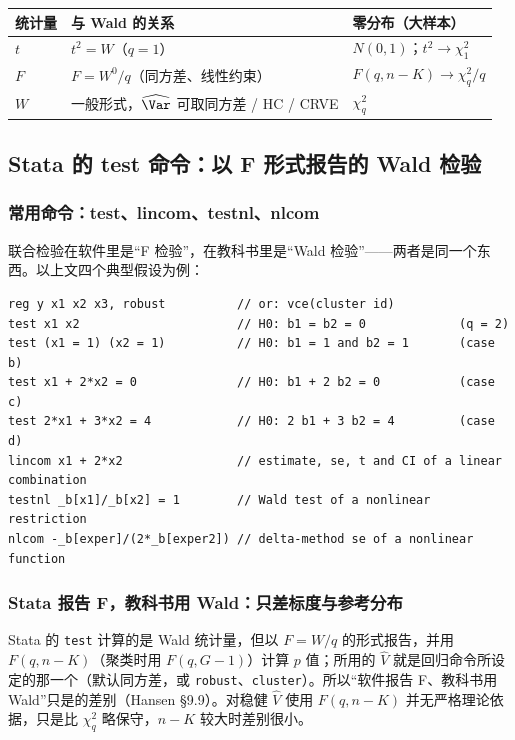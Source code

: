 \begin{center}
\small
\begin{tabularx}{\linewidth}{lLl}
\toprule
统计量 & 与 Wald 的关系 & 零分布（大样本）\\
\midrule
$t$ & $t^2=W$（$q=1$） & $N(0,1)$；$t^2\to\chi^2_1$\\
$F$ & $F=W^0/q$（同方差、线性约束） & $F(q,n-K)\to\chi^2_q/q$\\
$W$ & 一般形式，$\widehat{\Var}$ 可取同方差 / HC / CRVE & $\chi^2_q$\\
\bottomrule
\end{tabularx}
\end{center}

\subsection{Stata 的 test 命令：以 F 形式报告的 Wald 检验}

\subsubsection{常用命令：test、lincom、testnl、nlcom}

联合检验在软件里是“F 检验”，在教科书里是“Wald 检验”——两者是同一个东西。以上文四个典型假设为例：
\begin{lstlisting}
reg y x1 x2 x3, robust          // or: vce(cluster id)
test x1 x2                      // H0: b1 = b2 = 0             (q = 2)
test (x1 = 1) (x2 = 1)          // H0: b1 = 1 and b2 = 1       (case b)
test x1 + 2*x2 = 0              // H0: b1 + 2 b2 = 0           (case c)
test 2*x1 + 3*x2 = 4            // H0: 2 b1 + 3 b2 = 4         (case d)
lincom x1 + 2*x2                // estimate, se, t and CI of a linear combination
testnl _b[x1]/_b[x2] = 1        // Wald test of a nonlinear restriction
nlcom -_b[exper]/(2*_b[exper2]) // delta-method se of a nonlinear function
\end{lstlisting}

\subsubsection{Stata 报告 F，教科书用 Wald：只差标度与参考分布}

Stata 的 \texttt{test} 计算的是 Wald 统计量，但以 $F=W/q$ 的形式报告，并用 $F(q,n-K)$（聚类时用 $F(q,G-1)$）计算 $p$ 值；所用的 $\hat V$ 就是回归命令所设定的那一个（默认同方差，或 \texttt{robust}、\texttt{cluster}）。所以“软件报告 F、教科书用 Wald”只是的差别（Hansen §9.9）。对稳健 $\hat V$ 使用 $F(q,n-K)$ 并无严格理论依据，只是比 $\chi^2_q$ 略保守，$n-K$ 较大时差别很小。

